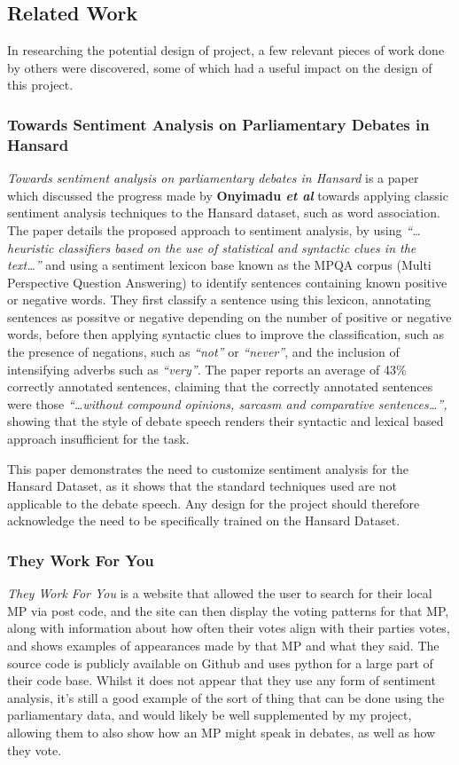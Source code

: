 \subsection{Related Work}
\label{sec:bck_related}

In researching the potential design of project, a few relevant pieces of work done by others were discovered, some of which had a useful impact on the design of this project. 

\subsubsection{Towards Sentiment Analysis on Parliamentary Debates in Hansard}
\emph{Towards sentiment analysis on parliamentary debates in Hansard}\cite{Onyimadu2014} is a paper which discussed the progress made by \textbf{Onyimadu \emph{et al}} towards applying classic sentiment analysis techniques to the Hansard dataset, such as word association. The paper details the proposed approach to sentiment analysis, by using \emph{“…heuristic classifiers based on the use of statistical and syntactic clues in the text…”} and using a sentiment lexicon base known as the MPQA corpus (Multi Perspective Question Answering) to identify sentences containing known positive or negative words. They first classify a sentence using this lexicon, annotating sentences as possitve or negative depending on the number of positive or negative words, before then applying syntactic clues to improve the classification, such as the presence of negations, such as \emph{“not”} or \emph{“never”}, and the inclusion of intensifying adverbs such as \emph{“very”}. The paper reports an average of 43\% correctly annotated sentences, claiming that the correctly annotated sentences were those \emph{“…without compound opinions, sarcasm and comparative sentences…”,} showing that the style of debate speech renders their syntactic and lexical based approach insufficient for the task.

This paper demonstrates the need to customize sentiment analysis for the Hansard Dataset, as it shows that the standard techniques used are not applicable to the debate speech. Any design for the project should therefore acknowledge the need to be specifically trained on the Hansard Dataset.

\subsubsection{They Work For You}
\emph{They Work For You}\cite{mySociety} is a website that allowed the user to search for their local MP via post code, and the site can then display the voting patterns for that MP, along with information about how often their votes align with their parties votes, and shows examples of appearances made by that MP and what they said. The source code is publicly available on Github and uses python for a large part of their code base. Whilst it does not appear that they use any form of sentiment analysis, it’s still a good example of the sort of thing that can be done using the parliamentary data, and would likely be well supplemented by my project, allowing them to also show how an MP might speak in debates, as well as how they vote.

